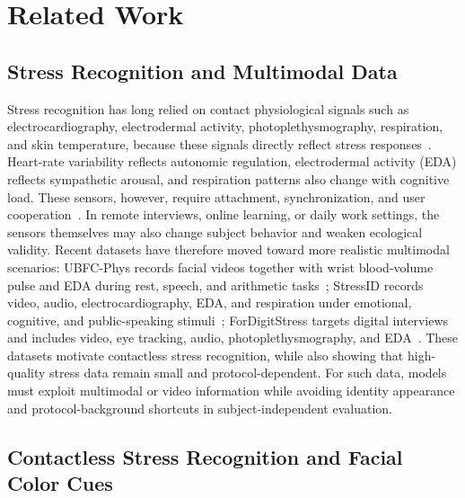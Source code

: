 \documentclass[runningheads]{llncs}
\begin{document}
\section{Related Work}

\subsection{Stress Recognition and Multimodal Data}

Stress recognition has long relied on contact physiological signals such as electrocardiography, electrodermal activity, photoplethysmography, respiration, and skin temperature, because these signals directly reflect stress responses~\cite{healey2005drivingstress,schmidt2018wesad,schmidt2019wearableaffectreview}. Heart-rate variability reflects autonomic regulation, electrodermal activity (EDA) reflects sympathetic arousal, and respiration patterns also change with cognitive load. These sensors, however, require attachment, synchronization, and user cooperation~\cite{schmidt2018wesad,bota2022empathicschool}. In remote interviews, online learning, or daily work settings, the sensors themselves may also change subject behavior and weaken ecological validity. Recent datasets have therefore moved toward more realistic multimodal scenarios: UBFC-Phys records facial videos together with wrist blood-volume pulse and EDA during rest, speech, and arithmetic tasks~\cite{sabour2021ubfcphys}; StressID records video, audio, electrocardiography, EDA, and respiration under emotional, cognitive, and public-speaking stimuli~\cite{chaptoukaev2023stressid}; ForDigitStress targets digital interviews and includes video, eye tracking, audio, photoplethysmography, and EDA~\cite{heimerl2024fordigitstress}. These datasets motivate contactless stress recognition, while also showing that high-quality stress data remain small and protocol-dependent. For such data, models must exploit multimodal or video information while avoiding identity appearance and protocol-background shortcuts in subject-independent evaluation.

\subsection{Contactless Stress Recognition and Facial Color Cues}
\end{document}
